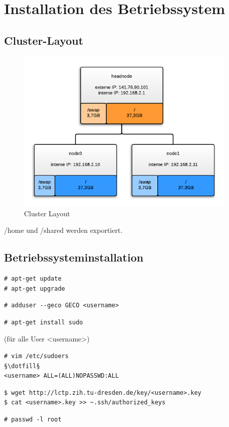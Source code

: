 \chapter{Installation des Betriebssystem}
\section{Cluster-Layout}
\begin{figure}[H]
	\centering
	\includegraphics[width=400px]{cluster_layout.png}
	\caption{Cluster Layout}
\end{figure}

/home und /shared werden exportiert.
\section{Betriebssysteminstallation}
\begin{lstlisting}[style=Bash]
# apt-get update 
# apt-get upgrade 
\end{lstlisting}
\begin{lstlisting}[style=Bash]
# adduser --geco GECO <username>
\end{lstlisting}
\begin{lstlisting}[style=Bash]
# apt-get install sudo
\end{lstlisting}
(für alle User <username>)
\begin{lstlisting}[style=Bash]
# vim /etc/sudoers
§\dotfill§
<username> ALL=(ALL)NOPASSWD:ALL
\end{lstlisting}
\begin{lstlisting}[style=Bash]
$ wget http://lctp.zih.tu-dresden.de/key/<username>.key
$ cat <username>.key >> ~.ssh/authorized_keys
\end{lstlisting}
\begin{lstlisting}[style=Bash]
# passwd -l root 
\end{lstlisting}

